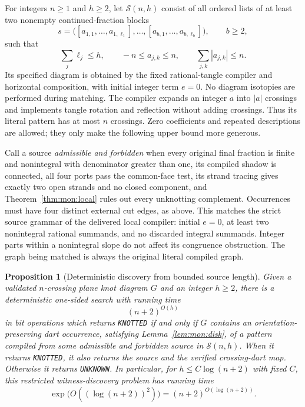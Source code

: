 \documentclass[11pt,a4paper]{article}
\newtheorem{proposition}[theorem]{Proposition}
\theoremstyle{definition}
\theoremstyle{remark}
\numberwithin{equation}{section}
\begin{document}
For integers $n\ge1$ and $h\ge2$, let $\mathcal S(n,h)$ consist of all
ordered lists of at least two nonempty continued-fraction blocks
\[
 s=\bigl([a_{1,1},\ldots,a_{1,\ell_1}],\ldots,
          [a_{b,1},\ldots,a_{b,\ell_b}]\bigr),\qquad b\ge2,
\]
such that
\[
 \sum_j\ell_j\le h,\qquad -n\le a_{j,k}\le n,
 \qquad \sum_{j,k}|a_{j,k}|\le n.
\]
Its specified diagram is obtained by the fixed rational-tangle compiler and
horizontal composition, with initial integer term $e=0$.  No diagram
isotopies are performed during matching.  The compiler expands an integer
$a$ into $|a|$ crossings and implements tangle rotation and reflection
without adding crossings.  Thus its literal pattern has at most $n$
crossings.  Zero coefficients and repeated descriptions are allowed; they
only make the following upper bound more generous.

Call a source \emph{admissible and forbidden} when every original final
fraction is finite and nonintegral with denominator greater than one, its
compiled shadow is connected, all four ports pass the common-face test, its
strand tracing gives exactly two open strands and no closed component, and
Theorem~\ref{thm:mon:local} rules out every unknotting complement. Occurrences
must have four distinct external cut edges, as above. This matches the strict
source grammar of the delivered local compiler: initial $e=0$, at least two
nonintegral rational summands, and no discarded integral summands. Integer
parts within a nonintegral slope do not affect its congruence obstruction.
The graph being matched is always the original literal compiled graph.

\begin{proposition}[Deterministic discovery from bounded source length]
\label{prop:mon:bounded-discovery}
Given a validated $n$-crossing plane knot diagram $G$ and an integer $h\ge2$,
there is a deterministic one-sided search with running time
\[
 (n+2)^{O(h)}
\]
in bit operations which returns \texttt{KNOTTED} if and only if $G$ contains
an orientation-preserving dart occurrence, satisfying
Lemma~\ref{lem:mon:disk}, of a pattern compiled from some admissible and
forbidden source in $\mathcal S(n,h)$.  When it returns \texttt{KNOTTED},
it also returns the source and the verified crossing-dart map.  Otherwise it
returns \texttt{UNKNOWN}.  In particular, for
$h\le C\log(n+2)$ with fixed $C$, this restricted witness-discovery problem
has running time
\[
 \exp\bigl(O((\log(n+2))^2)\bigr)
       =(n+2)^{O(\log(n+2))}.
\]
\end{proposition}
\end{document}
